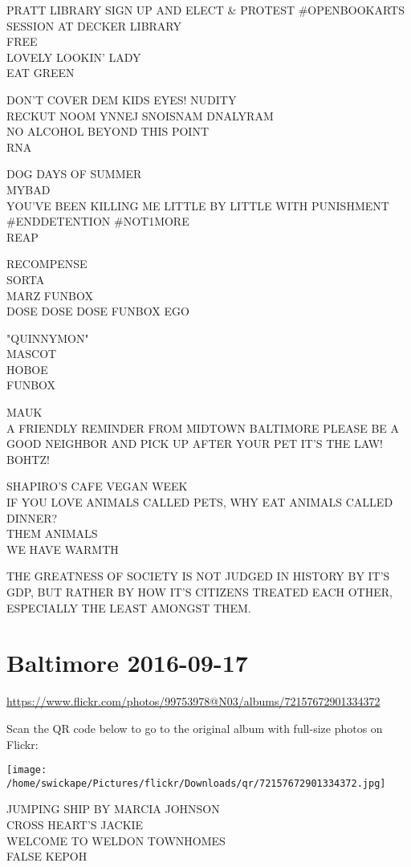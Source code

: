 \documentclass[10pt,letterpaper]{article}
\begin{document}
PRATT LIBRARY SIGN UP AND ELECT \& PROTEST \#OPENBOOKARTS SESSION AT DECKER LIBRARY\\
FREE\\
LOVELY LOOKIN' LADY\\
EAT GREEN

DON'T COVER DEM KIDS EYES!  NUDITY\\
RECKUT NOOM YNNEJ SNOISNAM DNALYRAM\\
NO ALCOHOL BEYOND THIS POINT\\
RNA

DOG DAYS OF SUMMER\\
MYBAD\\
YOU'VE BEEN KILLING ME LITTLE BY LITTLE WITH PUNISHMENT \#ENDDETENTION \#NOT1MORE\\
REAP

RECOMPENSE\\
SORTA\\
MARZ FUNBOX\\
DOSE DOSE DOSE FUNBOX EGO

"QUINNYMON"\\
MASCOT\\
HOBOE\\
FUNBOX

MAUK\\
A FRIENDLY REMINDER FROM MIDTOWN BALTIMORE PLEASE BE A GOOD NEIGHBOR AND PICK UP AFTER YOUR PET IT'S THE LAW!\\
BOHTZ!

SHAPIRO'S CAFE VEGAN WEEK\\
IF YOU LOVE ANIMALS CALLED PETS, WHY EAT ANIMALS CALLED DINNER?\\
THEM ANIMALS\\
WE HAVE WARMTH

THE GREATNESS OF SOCIETY IS NOT JUDGED IN HISTORY BY IT'S GDP, BUT RATHER BY HOW IT'S CITIZENS TREATED EACH OTHER, ESPECIALLY THE LEAST AMONGST THEM.


\section*{Baltimore 2016-09-17}

\url{https://www.flickr.com/photos/99753978@N03/albums/72157672901334372}

Scan the QR code below to go to the original album with full-size photos on Flickr:

\texttt{[image: /home/swickape/Pictures/flickr/Downloads/qr/72157672901334372.jpg]}


JUMPING SHIP BY MARCIA JOHNSON\\
CROSS HEART'S JACKIE\\
WELCOME TO WELDON TOWNHOMES\\
FALSE KEPOH
\end{document}
